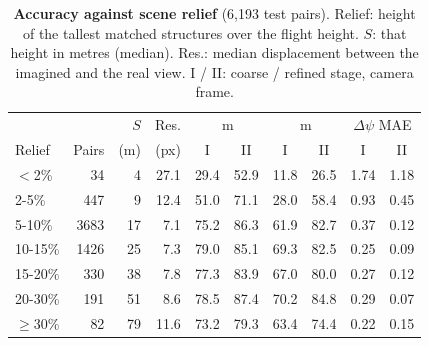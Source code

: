 \documentclass[10pt,twocolumn,letterpaper]{article}
\newcommand{\dpsi}{\Delta\psi}
\begin{document}
\begin{table}[t]
\centering
\caption{\textbf{Accuracy against scene relief} (6{,}193 test pairs). Relief: height of the tallest matched structures over the flight height. $S$: that height in metres (median). Res.: median displacement between the imagined and the real view. I / II: coarse / refined stage, camera frame.}
\label{tab:planarity}
\footnotesize
\setlength{\tabcolsep}{2.6pt}
\begin{tabular}{@{}lrrrcccccc@{}}
\toprule
& & $S$ & Res. & \multicolumn{2}{c}{\SRd@1\,m} & \multicolumn{2}{c}{\SRe@1\,m} & \multicolumn{2}{c}{$\dpsi$ MAE} \\
Relief & Pairs & (m) & (px) & I & II & I & II & I & II \\
\midrule
$<$2\% & 34 & 4 & 27.1 & 29.4 & 52.9 & 11.8 & 26.5 & 1.74 & 1.18 \\
2-5\% & 447 & 9 & 12.4 & 51.0 & 71.1 & 28.0 & 58.4 & 0.93 & 0.45 \\
5-10\% & 3683 & 17 & 7.1 & 75.2 & 86.3 & 61.9 & 82.7 & 0.37 & 0.12 \\
10-15\% & 1426 & 25 & 7.3 & 79.0 & 85.1 & 69.3 & 82.5 & 0.25 & 0.09 \\
15-20\% & 330 & 38 & 7.8 & 77.3 & 83.9 & 67.0 & 80.0 & 0.27 & 0.12 \\
20-30\% & 191 & 51 & 8.6 & 78.5 & 87.4 & 70.2 & 84.8 & 0.29 & 0.07 \\
$\geq$30\% & 82 & 79 & 11.6 & 73.2 & 79.3 & 63.4 & 74.4 & 0.22 & 0.15 \\
\bottomrule
\end{tabular}
\end{table}
\end{document}
